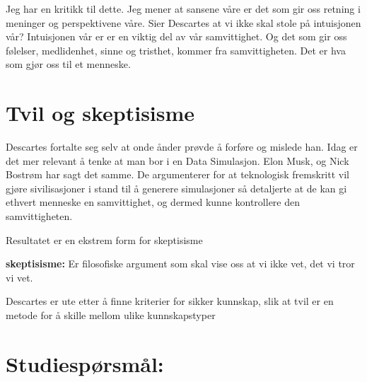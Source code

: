 \documentclass[11pt]{article}
\begin{document}
\vspace{1em}
Jeg har en kritikk til dette. Jeg mener at sansene våre er det som gir oss retning i meninger og perspektivene våre. Sier Descartes at vi ikke skal stole på intuisjonen vår? Intuisjonen vår er er en viktig del av vår samvittighet. Og det som gir oss følelser, medlidenhet, sinne og tristhet, kommer fra samvittigheten. Det er hva som gjør oss til et menneske.


\section{Tvil og skeptisisme}

Descartes fortalte seg selv at onde ånder  prøvde å forføre og mislede han. Idag er det mer relevant å tenke at man bor i en Data Simulasjon.
\vspace{1em}
Elon Musk, og Nick Bostrøm har sagt det samme. De argumenterer for at teknologisk fremskritt vil gjøre sivilisasjoner i stand til å generere simulasjoner så detaljerte at de kan gi ethvert menneske en samvittighet, og dermed kunne kontrollere  den samvittigheten.

\vspace{1em}
Resultatet er en ekstrem form for skeptisisme


\textbf{skeptisisme: } Er filosofiske argument som skal vise oss at  vi ikke vet, det vi tror vi vet.

Descartes er ute etter å finne kriterier for sikker kunnskap, slik at tvil er en metode for å skille mellom ulike kunnskapstyper



\section{Studiespørsmål:}
\end{document}
